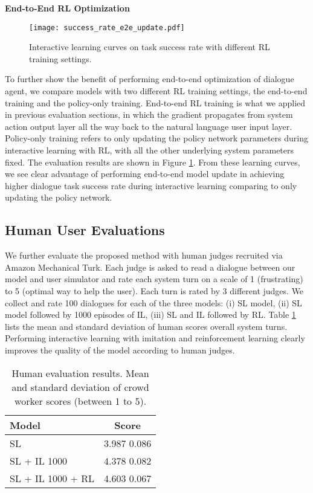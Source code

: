 \documentclass[11pt,a4paper]{article}
\begin{document}
\textbf{End-to-End RL Optimization} 
        \begin{figure}[t]
          \centering
          \texttt{[image: success\_rate\_e2e\_update.pdf]}
          \vspace*{-4ex}
          \caption{Interactive learning curves on task success rate with different RL training settings.}
          \label{fig:success_rate_e2e_update}
        \end{figure}
    To further show the benefit of performing end-to-end optimization of dialogue agent, we compare models with two different RL training settings, the end-to-end training and the policy-only training. End-to-end RL training is what we applied in previous evaluation sections, in which the gradient propagates from system action output layer all the way back to the natural language user input layer. Policy-only training refers to only updating the policy network parameters during interactive learning with RL, with all the other underlying system parameters fixed. The evaluation results are shown in Figure \ref{fig:success_rate_e2e_update}. From these learning curves, we see clear advantage of performing end-to-end model update in achieving higher dialogue task success rate during interactive learning comparing to only updating the policy network. 

\subsection{Human User Evaluations}
\label{sec:human_eval_results}
    We further evaluate the proposed method with human judges recruited via Amazon Mechanical Turk. Each judge is asked to read a dialogue between our model and user simulator and rate each system turn on a scale of 1 (frustrating) to 5 (optimal way to help the user). Each turn is rated by 3 different judges. We collect and rate 100 dialogues for each of the three models: (i) SL model, (ii) SL model followed by 1000 episodes of IL, (iii) SL and IL followed by RL. Table \ref{tab:eval_result_human} lists the mean and standard deviation of human scores overall system turns. Performing interactive learning with imitation and reinforcement learning clearly improves the quality of the model according to human judges.
    
    \begin{table}[th]
    \centering
    \begin{tabular}{l|c}
    \hline
    \textbf{Model} & \textbf{Score}      \\ \hline
    SL & 3.987  0.086  \\
    SL + IL 1000 & 4.378  0.082 \\
    SL + IL 1000 + RL & 4.603  0.067 \\ \hline
    \end{tabular}
    \caption{Human evaluation results. Mean and standard deviation of crowd worker scores (between 1 to 5).}
    \label{tab:eval_result_human}
    \vspace*{-1ex}
    \end{table}
\end{document}
